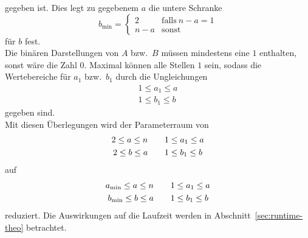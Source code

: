 gegeben ist. Dies legt zu gegebenem $a$ die untere Schranke
\begin{equation}
		b_\mathrm{\min}=\begin{cases}
						2 & \mathrm{falls}\:n-a=1 \\
						n-a & \mathrm{sonst}
		\end{cases}\label{eq:amax}
\end{equation}
für $b$ fest.\\
Die binären Darstellungen von $A$ bzw.\ $B$ müssen mindestens eine $1$ enthalten, sonst wäre die Zahl $0$. Maximal können alle Stellen $1$ sein, sodass die Wertebereiche für $a_1$ bzw.\ $b_1$ durch die Ungleichungen
\begin{align*}
		1\leq a_1\leq a \\
		1\leq b_1\leq b
\end{align*}
gegeben sind.\\
Mit diesen Überlegungen wird der Parameterraum von
\begin{align}
		2 \leq a \leq n &\quad\quad 1 \leq a_1 \leq a \notag \\
		2 \leq b \leq a &\quad\quad	1 \leq b_1 \leq b \label{eq:parameterspace1}
\end{align}
auf
\begin{align}
		a_\mathrm{\min} \leq a \leq n &\quad\quad	1 \leq a_1 \leq a \notag \\
		b_\mathrm{\min} \leq b \leq a &\quad\quad	1 \leq b_1 \leq b \label{eq:parameterspace2}
\end{align}
reduziert. Die Auswirkungen auf die Laufzeit werden in Abschnitt~\ref{sec:runtime-theo} betrachtet.

